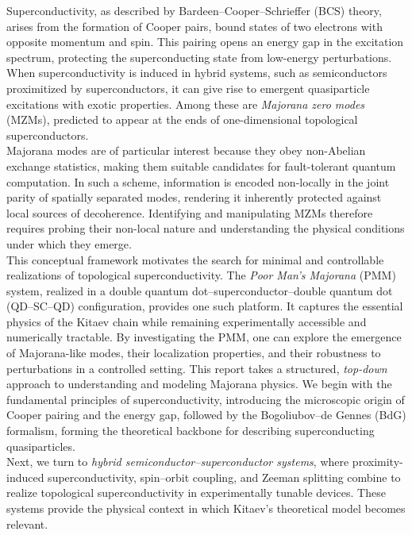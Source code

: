 \documentclass[11pt, letterpaper, titlepage]{article}
\begin{document}
Superconductivity, as described by Bardeen–Cooper–Schrieffer (BCS) theory, arises from the formation of Cooper pairs, bound states of two electrons with opposite momentum and spin. This pairing opens an energy gap in the excitation spectrum, protecting the superconducting state from low-energy perturbations. When superconductivity is induced in hybrid systems, such as semiconductors proximitized by superconductors, it can give rise to emergent quasiparticle excitations with exotic properties. Among these are \textit{Majorana zero modes} (MZMs), predicted to appear at the ends of one-dimensional topological superconductors.\\  
Majorana modes are of particular interest because they obey non-Abelian exchange statistics, making them suitable candidates for fault-tolerant quantum computation. In such a scheme, information is encoded non-locally in the joint parity of spatially separated modes, rendering it inherently protected against local sources of decoherence. Identifying and manipulating MZMs therefore requires probing their non-local nature and understanding the physical conditions under which they emerge.\\  
This conceptual framework motivates the search for minimal and controllable realizations of topological superconductivity. The \textit{Poor Man’s Majorana} (PMM) system, realized in a double quantum dot–superconductor–double quantum dot (QD–SC–QD) configuration, provides one such platform. It captures the essential physics of the Kitaev chain while remaining experimentally accessible and numerically tractable. By investigating the PMM, one can explore the emergence of Majorana-like modes, their localization properties, and their robustness to perturbations in a controlled setting.
\vspace{0.5em}
This report takes a structured, \textit{top-down} approach to understanding and modeling Majorana physics. We begin with the fundamental principles of superconductivity, introducing the microscopic origin of Cooper pairing and the energy gap, followed by the Bogoliubov–de Gennes (BdG) formalism, forming the theoretical backbone for describing superconducting quasiparticles.\\  
Next, we turn to \textit{hybrid semiconductor–superconductor systems}, where proximity-induced superconductivity, spin–orbit coupling, and Zeeman splitting combine to realize topological superconductivity in experimentally tunable devices. These systems provide the physical context in which Kitaev’s theoretical model becomes relevant.\\
\end{document}
